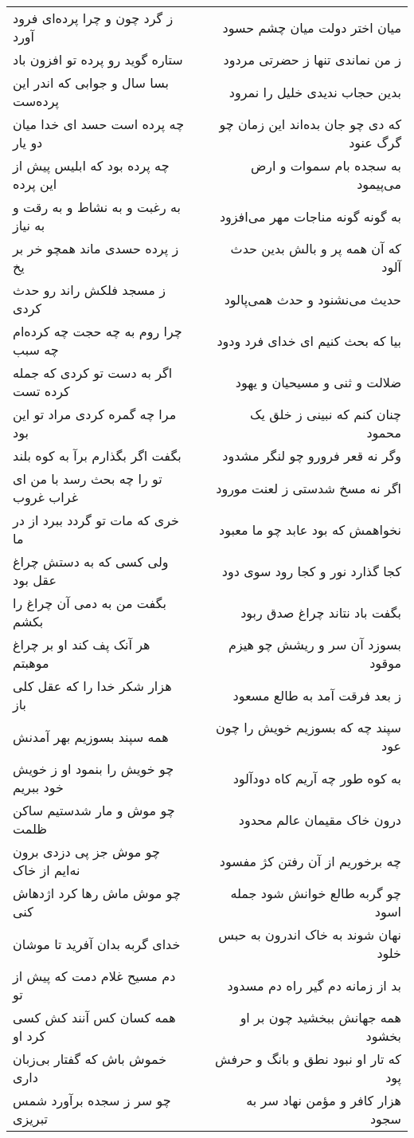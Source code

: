 \begin{center}
\begin{longtable}{l p{0.5cm} r}
\\
ز گرد چون و چرا پرده‌ای فرود آورد
&&
میان اختر دولت میان چشم حسود
\\
ستاره گوید رو پرده تو افزون باد
&&
ز من نماندی تنها ز حضرتی مردود
\\
بسا سال و جوابی که اندر این پرده‌ست
&&
بدین حجاب ندیدی خلیل را نمرود
\\
چه پرده است حسد ای خدا میان دو یار
&&
که دی چو جان بده‌اند این زمان چو گرگ عنود
\\
چه پرده بود که ابلیس پیش از این پرده
&&
به سجده بام سموات و ارض می‌پیمود
\\
به رغبت و به نشاط و به رقت و به نیاز
&&
به گونه گونه مناجات مهر می‌افزود
\\
ز پرده حسدی ماند همچو خر بر یخ
&&
که آن همه پر و بالش بدین حدث آلود
\\
ز مسجد فلکش راند رو حدث کردی
&&
حدیث می‌نشنود و حدث همی‌پالود
\\
چرا روم به چه حجت چه کرده‌ام چه سبب
&&
بیا که بحث کنیم ای خدای فرد ودود
\\
اگر به دست تو کردی که جمله کرده تست
&&
ضلالت و ثنی و مسیحیان و یهود
\\
مرا چه گمره کردی مراد تو این بود
&&
چنان کنم که نبینی ز خلق یک محمود
\\
بگفت اگر بگذارم برآ به کوه بلند
&&
وگر نه قعر فرورو چو لنگر مشدود
\\
تو را چه بحث رسد با من ای غراب غروب
&&
اگر نه مسخ شدستی ز لعنت مورود
\\
خری که مات تو گردد ببرد از در ما
&&
نخواهمش که بود عابد چو ما معبود
\\
ولی کسی که به دستش چراغ عقل بود
&&
کجا گذارد نور و کجا رود سوی دود
\\
بگفت من به دمی آن چراغ را بکشم
&&
بگفت باد نتاند چراغ صدق ربود
\\
هر آنک پف کند او بر چراغ موهبتم
&&
بسوزد آن سر و ریشش چو هیزم موقود
\\
هزار شکر خدا را که عقل کلی باز
&&
ز بعد فرقت آمد به طالع مسعود
\\
همه سپند بسوزیم بهر آمدنش
&&
سپند چه که بسوزیم خویش را چون عود
\\
چو خویش را بنمود او ز خویش خود ببریم
&&
به کوه طور چه آریم کاه دودآلود
\\
چو موش و مار شدستیم ساکن ظلمت
&&
درون خاک مقیمان عالم محدود
\\
چو موش جز پی دزدی برون نه‌ایم از خاک
&&
چه برخوریم از آن رفتن کژ مفسود
\\
چو موش ماش رها کرد اژدهاش کنی
&&
چو گربه طالع خوانش شود جمله اسود
\\
خدای گربه بدان آفرید تا موشان
&&
نهان شوند به خاک اندرون به حبس خلود
\\
دم مسیح غلام دمت که پیش از تو
&&
بد از زمانه دم گیر راه دم مسدود
\\
همه کسان کس آنند کش کسی کرد او
&&
همه جهانش ببخشید چون بر او بخشود
\\
خموش باش که گفتار بی‌زبان داری
&&
که تار او نبود نطق و بانگ و حرفش پود
\\
چو سر ز سجده برآورد شمس تبریزی
&&
هزار کافر و مؤمن نهاد سر به سجود
\\
\end{longtable}
\end{center}
